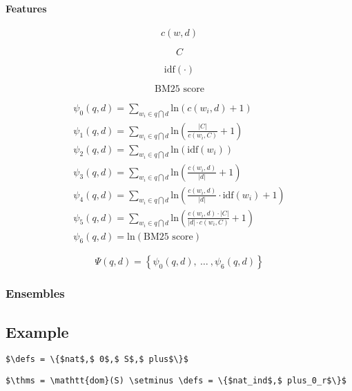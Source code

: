 \paragraph{Features}

\begin{definition}
  \[ c(w, d) \]
\end{definition}

\begin{definition}
  \[ C \]
\end{definition}

\begin{definition}
  \[ \text{idf}(\cdot) \]
\end{definition}

\begin{definition}
  \[ \text{BM25 score} \]
\end{definition}

\begin{definition}
  \[
  \begin{array}{l}
    \psi_0(q, d) = \sum_{w_i \in q \bigcap d} \text{ln}(c(w_i, d) + 1) \\
    \psi_1(q, d) = \sum_{w_i \in q \bigcap d} \text{ln}(\frac{|C|}{c(w_i, C)} + 1) \\
    \psi_2(q, d) = \sum_{w_i \in q \bigcap d} \text{ln}(\text{idf}(w_i)) \\
    \psi_3(q, d) = \sum_{w_i \in q \bigcap d} \text{ln}(\frac{c(w_i, d)}{|d|} + 1) \\
    \psi_4(q, d) = \sum_{w_i \in q \bigcap d} \text{ln}(\frac{c(w_i, d)}{|d|} \cdot \text{idf}(w_i) + 1) \\
    \psi_5(q, d) = \sum_{w_i \in q \bigcap d} \text{ln}(\frac{c(w_i, d) \cdot |C|}{|d| \cdot c(w_i, C)} + 1) \\
    \psi_6(q, d) = \text{ln}( \text{BM25 score} )
  \end{array}
  \]

  \[
    \Psi(q, d) = \left\{ \psi_0(q, d), ~\ldots~, \psi_6(q, d) \right\}
  \]
\end{definition}

\subsubsection{Ensembles}

\subsection{Example}

\begin{lstlisting}[language=Coq, mathescape, frame=none]
$\defs = \{$nat$,$ 0$,$ S$,$ plus$\}$
\end{lstlisting}

\begin{lstlisting}[language=Coq, mathescape, frame=none]
$\thms = \mathtt{dom}(S) \setminus \defs = \{$nat_ind$,$ plus_0_r$\}$
\end{lstlisting}
